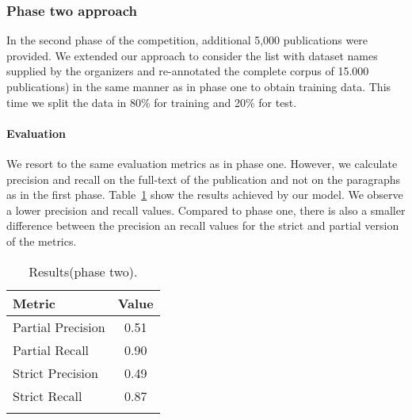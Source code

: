 \subsubsection{Phase two approach}
In the second phase of the competition, additional 5,000 publications were provided. We extended our approach to consider the list with dataset names supplied by the organizers and re-annotated the complete corpus of 15.000 publications) in the same manner as in phase one to obtain training data. This time we split the data in 80\% for training and 20\% for test. 

\paragraph{Evaluation}
We resort to the same evaluation metrics as in phase one. However, we calculate precision and recall on the full-text of the publication and not on the paragraphs as in the first phase. Table~\ref{table:dataset-mention-eval-phase-two} show the results achieved by our model. We observe a lower precision and recall values. Compared to phase one, there is also a smaller difference between the precision an recall values for the strict and partial version of the metrics. 
\begin{table}[hb]
    \center 
    \caption{Results(phase two).} 
    \begin{tabular}{lc} 
        \toprule
        Metric  & Value \\
        \midrule
        Partial Precision   & 0.51 \\
        Partial Recall      & 0.90 \\
        \midrule
        Strict Precision    & 0.49 \\
        Strict Recall       & 0.87 \\ 
        \bottomrule \\ 
    \end{tabular} 
    \label{table:dataset-mention-eval-phase-two} 
\end{table}

